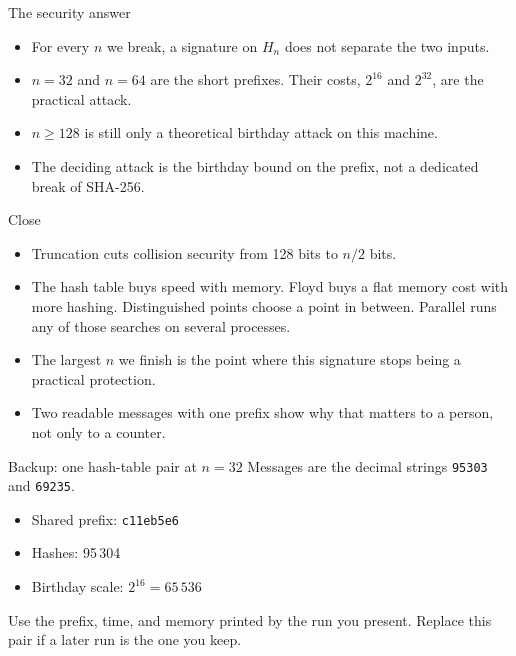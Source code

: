 \documentclass[aspectratio=169,11pt]{beamer}
\newcommand{\Hn}{H_{n}}
\begin{document}
\begin{frame}{The security answer}
  \begin{itemize}
    \item For every \(n\) we break, a signature on \(\Hn\) does not separate the two inputs.
    \item \(n = 32\) and \(n = 64\) are the short prefixes. Their costs, \(2^{16}\) and \(2^{32}\), are the practical attack.
    \item \(n \ge 128\) is still only a theoretical birthday attack on this machine.
    \item The deciding attack is the birthday bound on the prefix, not a dedicated break of SHA-256.
  \end{itemize}
\end{frame}

\begin{frame}{Close}
  \begin{itemize}
    \item Truncation cuts collision security from 128 bits to \(n/2\) bits.
    \item The hash table buys speed with memory. Floyd buys a flat memory cost with more hashing. Distinguished points choose a point in between. Parallel runs any of those searches on several processes.
    \item The largest \(n\) we finish is the point where this signature stops being a practical protection.
    \item Two readable messages with one prefix show why that matters to a person, not only to a counter.
  \end{itemize}
\end{frame}

\appendix

\begin{frame}{Backup: one hash-table pair at \(n = 32\)}
  Messages are the decimal strings \texttt{95303} and \texttt{69235}.
  \begin{itemize}
    \item Shared prefix: \texttt{c11eb5e6}
    \item Hashes: 95\,304
    \item Birthday scale: \(2^{16} = 65\,536\)
  \end{itemize}
  \vspace{0.4em}
  {\scriptsize Use the prefix, time, and memory printed by the run you present. Replace this pair if a later run is the one you keep.}
\end{frame}
\end{document}
